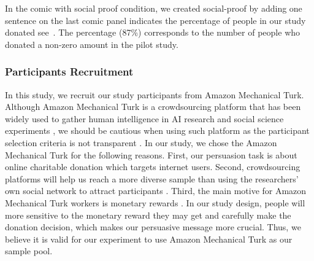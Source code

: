 

In the comic with social proof condition, we created social-proof by adding one sentence on the last comic panel indicates the percentage of people in our study donated see~. The percentage (87\%) corresponds to the number of people who donated a non-zero amount in the pilot study.


\subsubsection{Participants Recruitment}
In this study, we recruit our study participants from Amazon Mechanical Turk. Although Amazon Mechanical Turk is a crowdsourcing platform that has been widely used to gather human intelligence in AI research and social science experiments \cite{ paolacci2014inside,berinsky2012evaluating,buhrmester2011amazon}, we should be cautious when using such platform as the participant selection criteria is not transparent \cite{landers2015inconvenient,paolacci2010running}. In our study, we chose the Amazon Mechanical Turk for the following reasons. First, our persuasion task is about online charitable donation which targets internet users. Second, crowdsourcing platforms will help us reach a more diverse sample than using the researchers' own social network to attract participants \cite{buhrmester2011amazon}. Third, the main motive for Amazon Mechanical Turk workers is monetary rewards \cite{berinsky2012evaluating}. In our study design, people will more sensitive to the monetary reward they may get and carefully make the donation decision, which makes our persuasive message more crucial. Thus, we believe it is valid for our experiment to use Amazon Mechanical Turk as our sample pool. 

